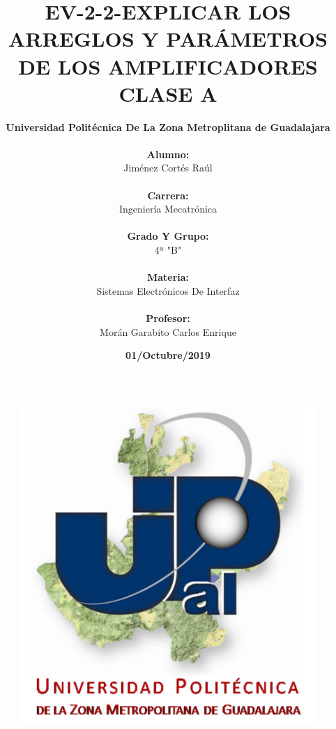 \documentclass[10pt,a4paper]{article}
\author{\textbf{Universidad Politécnica De La Zona Metroplitana de Guadalajara }\\\\ \textbf{Alumno:}\\ Jiménez Cortés Raúl \\\\ \textbf{Carrera:}\\ Ingeniería Mecatrónica\\\\ \textbf{Grado Y Grupo:}\\ 4ª "B" \\\\
\textbf{Materia:}\\ Sistemas Electrónicos De Interfaz \\\\ \textbf{Profesor:}\\ Morán Garabito Carlos Enrique}
\title{\textbf{EV-2-2-EXPLICAR LOS ARREGLOS Y PARÁMETROS DE LOS AMPLIFICADORES CLASE A}}
\date{\textbf{01/Octubre/2019}}
\begin{document}
\begin{figure}
\centering
\includegraphics[scale=1]{Pa.jpg}
\end{figure}

\maketitle

\newpage
\end{document}
